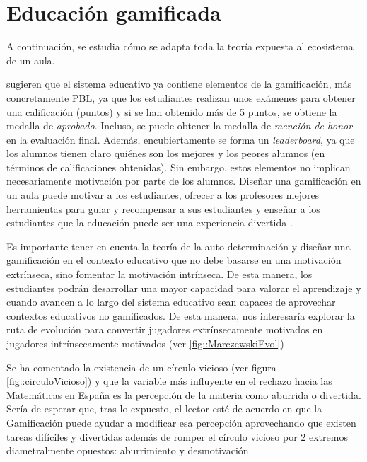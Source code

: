 

\chapter{Educación gamificada}

A continuación, se estudia cómo se adapta toda la teoría expuesta al ecosistema de un aula.


\cite{lee2011gamification} sugieren que el sistema educativo ya contiene elementos de la gamificación, más concretamente \gls{PBL}, ya que los estudiantes realizan unos exámenes para obtener una calificación (puntos) y si se han obtenido más de 5 puntos, se obtiene la medalla de \textit{aprobado}.
%
Incluso, se puede obtener la medalla de \textit{mención de honor} en la evaluación final.
%
Además, encubiertamente se forma un \textit{leaderboard}, ya que los alumnos tienen claro quiénes son los mejores y los peores alumnos (en términos de calificaciones obtenidas).
%
Sin embargo, estos elementos no implican necesariamente motivación por parte de los alumnos.
%
Diseñar una gamificación en un aula puede motivar a los estudiantes, ofrecer a los profesores mejores herramientas para guiar y recompensar a sus estudiantes y enseñar a los estudiantes que la educación puede ser una experiencia divertida  \citep{lee2011gamification}.

Es importante tener en cuenta la teoría de la auto-determinación  y diseñar una gamificación en el contexto educativo que no debe basarse en una motivación extrínseca, sino fomentar la motivación intrínseca. 
%
De esta manera, los estudiantes podrán desarrollar una mayor capacidad para valorar el aprendizaje y cuando avancen a lo largo del sistema educativo sean capaces de aprovechar contextos educativos no gamificados. 
%
De esta manera, nos interesaría explorar la ruta de evolución \citep{marczewski}  para convertir jugadores extrínsecamente motivados en jugadores intrínsecamente motivados (ver \ref{fig::MarczewskiEvol})


Se ha comentado la existencia de un círculo vicioso (ver figura \ref{fig::circuloVicioso}) y que la variable más influyente en el rechazo hacia las Matemáticas en España es la percepción de la materia como aburrida o divertida.
%
Sería de esperar que, tras lo expuesto, el lector esté de acuerdo en que la Gamificación puede ayudar a modificar esa percepción aprovechando que existen tareas difíciles y divertidas  además de romper el círculo vicioso por 2 extremos diametralmente opuestos: aburrimiento y desmotivación.


